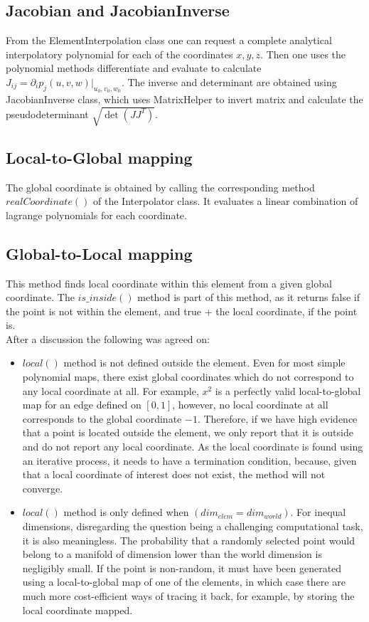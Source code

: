 \documentclass[12pt]{article}
\begin{document}
\subsection{Jacobian and JacobianInverse}

From the ElementInterpolation class one can request a complete analytical interpolatory polynomial for each of the coordinates $x,y,z$. Then one uses the polynomial methods differentiate and evaluate to calculate $J_{ij} = \partial_i p_j (u,v,w) |_{u_0, v_0, w_0}$. The inverse and determinant are obtained using JacobianInverse class, which uses MatrixHelper to invert matrix and calculate the pseudodeterminant $\sqrt{\det(JJ^T)}$. \\

\subsection{Local-to-Global mapping}

The global coordinate is obtained by calling the corresponding method $realCoordinate()$ of the Interpolator class. It evaluates a linear combination of lagrange polynomials for each coordinate.

\subsection{Global-to-Local mapping}

This method finds local coordinate within this element from a given global coordinate. The $is\_inside()$ method is part of this method, as it returns false if the point is not within the element, and true + the local coordinate, if the point is. \\

\noindent
After a discussion the following was agreed on:
\begin{itemize}
	\item $local()$ method is not defined outside the element. Even for most simple polynomial maps, there exist global coordinates which do not correspond to any local coordinate at all. For example, $x^2$ is a perfectly valid local-to-global map for an edge defined on $[0,1]$, however, no local coordinate at all corresponds to the global coordinate $-1$. Therefore, if we have high evidence that a point is located outside the element, we only report that it is outside and do not report any local coordinate. As the local coordinate is found using an iterative process, it needs to have a termination condition, because, given that a local coordinate of interest does not exist, the method will not converge.
	\item $local()$ method is only defined when $(dim_{elem} = dim_{world})$. For inequal dimensions, disregarding the question being a challenging computational task, it is also meaningless. The probability that a randomly selected point would belong to a manifold of dimension lower than the world dimension is negligibly small. If the point is non-random, it must have been generated using a local-to-global map of one of the elements, in which case there are much more cost-efficient ways of tracing it back, for example, by storing the local coordinate mapped.
\end{itemize}
\end{document}
